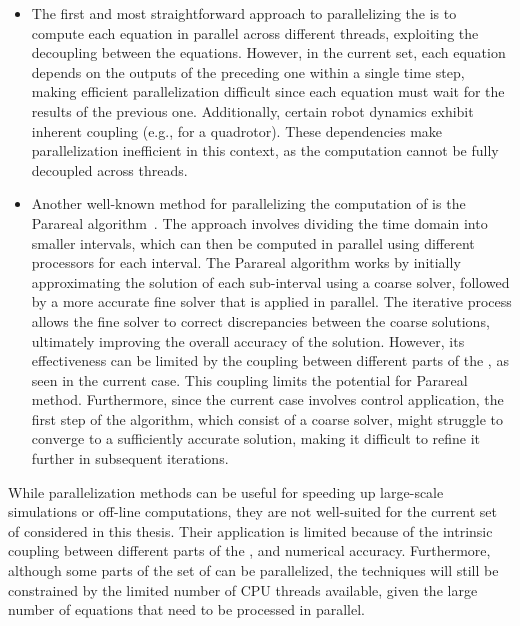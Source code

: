 \begin{itemize}
    \item The first and most straightforward approach to parallelizing the  is to compute each equation in parallel across different threads, exploiting the decoupling between the equations. 
    However, in the current set, each equation depends on the outputs of the preceding one within a single time step, making efficient parallelization difficult since each equation must wait for the results of the previous one.
    Additionally, certain robot dynamics exhibit inherent coupling (e.g., for a quadrotor).
    These dependencies make parallelization inefficient in this context, as the computation cannot be fully decoupled across threads. 
    \item Another well-known method for parallelizing the computation of  is the Parareal algorithm~\cite{cParareal}.
    The approach involves dividing the time domain into smaller intervals, which can then be computed in parallel using different processors for each interval. 
    The Parareal algorithm works by initially approximating the solution of each sub-interval using a coarse solver, followed by a more accurate fine solver that is applied in parallel. 
    The iterative process allows the fine solver to correct discrepancies between the coarse solutions, ultimately improving the overall accuracy of the solution.
    However, its effectiveness can be limited by the coupling between different parts of the , as seen in the current case.
    This coupling limits the potential for Parareal method.
    Furthermore, since the current case involves control application, the first step of the algorithm, which consist of a coarse solver, might struggle to converge to a sufficiently accurate solution, making it difficult to refine it further in subsequent iterations.
\end{itemize}

While  parallelization methods can be useful for speeding up large-scale simulations or off-line computations, they are not well-suited for the current set of  considered in this thesis.
Their application is limited because of the intrinsic coupling between different parts of the , and numerical accuracy. 
Furthermore, although some parts of the set of  can be parallelized, the techniques will still be constrained by the limited number of CPU threads available, given the large number of equations that need to be processed in parallel.

